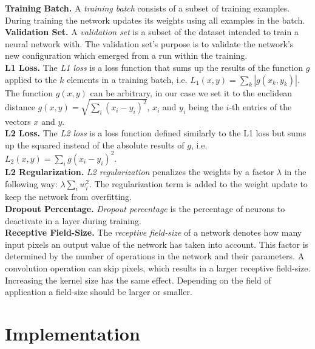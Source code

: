 \noindent\textbf{Training Batch.} A \textit{training batch} consists of a subset of training examples. During training the network updates its weights using all examples in the batch. \\

\noindent\textbf{Validation Set.} A \textit{validation set} is a subset of the dataset intended to train a neural network with. The validation set's purpose is to validate the network's new configuration which emerged from a run within the training. \\

\noindent\textbf{L1 Loss.} The \textit{L1 loss} is a loss function that sums up the results of the function $g$ applied to the $k$ elements in a training batch, i.e. $L_1(x, y) = \sum\limits_k |g(x_k, y_k)|$. The function $g(x, y)$ can be arbitrary, in our case we set it to the euclidean distance $g(x, y) = \sqrt{\sum\limits_i (x_i - y_i)^2}$, $x_i$ and $y_i$ being the $i$-th entries of the vectors $x$ and $y$. \\

\noindent\textbf{L2 Loss.} The \textit{L2 loss} is a loss function defined similarly to the L1 loss but sums up the squared instead of the absolute results of $g$, i.e. $L_2(x, y) = \sum\limits_i g(x_i - y_i)^2$. \\

\noindent\textbf{L2 Regularization.} \textit{L2 regularization} penalizes the weights by a factor $\lambda$ in the following way: $\lambda \sum\limits_i w_i^2$. The regularization term is added to the weight update to keep the network from overfitting. \\

\noindent\textbf{Dropout Percentage.} \textit{Dropout percentage} is the percentage of neurons to deactivate in a layer during training. \\

\noindent\textbf{Receptive Field-Size.} The \textit{receptive field-size} of a network denotes how many input pixels an output value of the network has taken into account. This factor is determined by the number of operations in the network and their parameters. A convolution operation can skip pixels, which results in a larger receptive field-size. Increasing the kernel size has the same effect. Depending on the field of application a field-size should be larger or smaller.

\section{Implementation}

